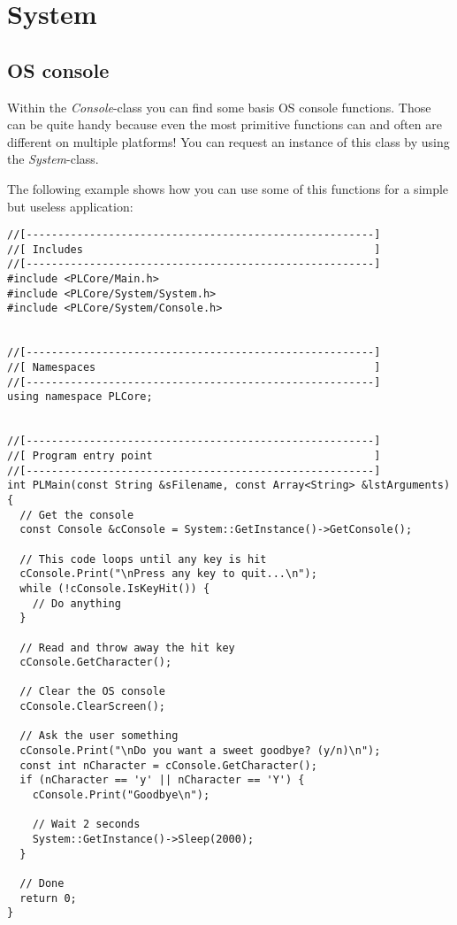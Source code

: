 \chapter{System}




\section{OS console}
Within the \emph{Console}-class you can find some basis OS console functions. Those can be quite handy because even the most primitive functions can and often are different on multiple platforms! You can request an instance of this class by using the \emph{System}-class.

The following example shows how you can use some of this functions for a simple but useless application:

\begin{lstlisting}[caption=OS console usage example]
//[-------------------------------------------------------]
//[ Includes                                              ]
//[-------------------------------------------------------]
#include <PLCore/Main.h>
#include <PLCore/System/System.h>
#include <PLCore/System/Console.h>


//[-------------------------------------------------------]
//[ Namespaces                                            ]
//[-------------------------------------------------------]
using namespace PLCore;


//[-------------------------------------------------------]
//[ Program entry point                                   ]
//[-------------------------------------------------------]
int PLMain(const String &sFilename, const Array<String> &lstArguments)
{
  // Get the console
  const Console &cConsole = System::GetInstance()->GetConsole();

  // This code loops until any key is hit
  cConsole.Print("\nPress any key to quit...\n");
  while (!cConsole.IsKeyHit()) {
    // Do anything
  }

  // Read and throw away the hit key
  cConsole.GetCharacter();

  // Clear the OS console
  cConsole.ClearScreen();

  // Ask the user something
  cConsole.Print("\nDo you want a sweet goodbye? (y/n)\n");
  const int nCharacter = cConsole.GetCharacter();
  if (nCharacter == 'y' || nCharacter == 'Y') {
    cConsole.Print("Goodbye\n");

    // Wait 2 seconds
    System::GetInstance()->Sleep(2000);
  }

  // Done
  return 0;
}
\end{lstlisting}
